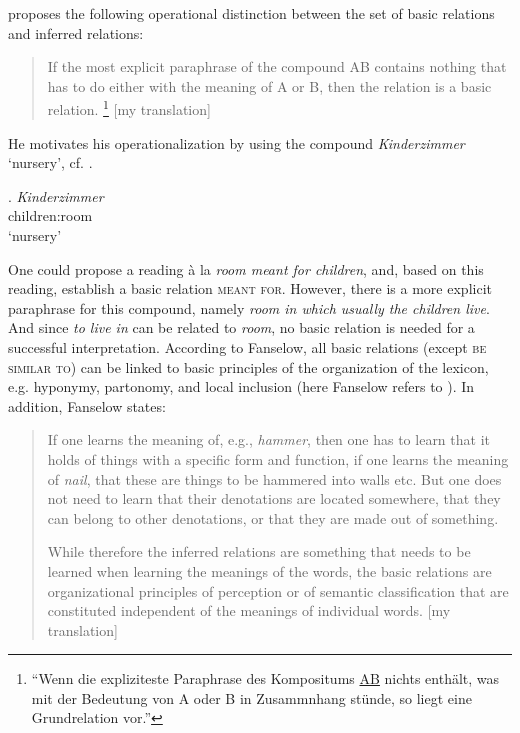 \citet[157]{Fanselow:1981} proposes the following operational distinction
between the set of basic relations and inferred relations:
\begin{quotation}
If the most explicit paraphrase
    of the compound AB contains nothing that has to do either with the
    meaning of A or B, then the relation is a basic relation. \footnote{``Wenn die expliziteste Paraphrase des
    Kompositums \uline{AB} nichts enthält, was mit der Bedeutung von A oder B
    in Zusammnhang stünde, so liegt eine Grundrelation vor.''}
    [my translation] \citep[157]{Fanselow:1981}
\end{quotation}
 He motivates  his
 operationalization by using the compound \emph{Kinder\-zimmer} `nursery', cf. \Next.

 \ex. \gll
 \emph{Kinder\-zimmer} \\
children:room\\
`nursery'

One could propose a reading à la \emph{room meant for
    children}, and, based on this reading, establish a basic relation \textsc{meant
  for}. However, there is a more explicit paraphrase for this compound, namely \emph{room
    in which usually the children live}. And since \emph{to live in} can be
  related to \emph{room}, no basic relation is needed for a successful interpretation. 
According to Fanselow, all basic relations (except \textsc{be similar to}) can be linked to basic principles of the
  organization of the lexicon, e.g. hyponymy, partonomy, and local
  inclusion (here Fanselow refers to \citealt[79]{Miller:1978}). In addition, Fanselow states:
  \begin{quotation}
If one learns the meaning of, e.g., \emph{hammer}, then one has to
  learn that it holds of things with a specific form and function, if
  one learns the meaning of \emph{nail}, that these are things to be
  hammered into walls etc. But one does not need to learn that their
  denotations are located somewhere, that they can belong to other
  denotations, or that they are made out of something.

While therefore the inferred relations are something that
  needs to be learned when learning the meanings of the words, the
  basic relations are organizational principles of perception or of
  semantic classification that are constituted independent of the
  meanings of individual words. [my translation] \citep[158]{Fanselow:1981}
    
  \end{quotation}

